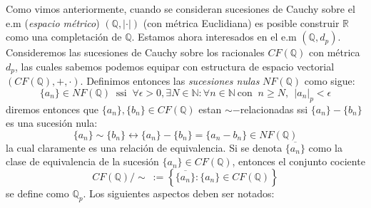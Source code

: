\documentclass[spanish, fleqn]{article}
\begin{document}
Como vimos anteriormente, cuando se consideran sucesiones de Cauchy sobre el e.m (\textit{espacio métrico}) $(\mathbb{Q}, |\cdot|)$ (con métrica Euclidiana) es posible construir $\mathbb{R}$ como una completación de $\mathbb{Q}$. Estamos ahora interesados en el e.m $(\mathbb{Q}, d_p)$.
\\

Consideremos las sucesiones de Cauchy sobre los racionales $CF(\mathbb{Q})$ con métrica $d_p$, las cuales sabemos podemos equipar con estructura de espacio vectorial $(CF(\mathbb{Q}), +, \cdot)$. Definimos entonces las \textit{sucesiones nulas} $NF(\mathbb{Q})$ como sigue:
\begin{equation*}
    \{a_n\} \in NF(\mathbb{Q}) \ \text{ ssi } \ \forall \epsilon>0, \exists N \in \mathbb{N}: \forall n \in \mathbb{N} \ \text{con } \ n \geq N, \ \ |a_n|_p < \epsilon
\end{equation*}
diremos entonces que $\{a_n\}, \{b_n\} \in CF(\mathbb{Q})$ estan $\sim -$relacionadas ssi $\{a_n\} - \{b_n \}$ es una sucesión nula:
\begin{equation*}
    \{a_n\} \sim \{b_n\} \leftrightarrow \{a_n\}-\{b_n\}=\{a_n-b_n\} \in NF(\mathbb{Q})
\end{equation*}
la cual claramente es una relación de equivalencia. Si se denota $\overline{\{a_n\}}$ como la clase de equivalencia de la sucesión $\{a_n\} \in CF(\mathbb{Q})$, entonces el conjunto cociente
\begin{equation*}
    CF(\mathbb{Q})/\sim \ := \left\{ \overline{\{a_n\}}: \{a_n\} \in CF(\mathbb{Q}) \right\}
\end{equation*}
se define como $\mathbb{Q}_p$. Los siguientes aspectos deben ser notados:
\end{document}
